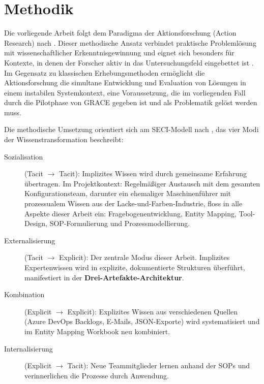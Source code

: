 \section{Methodik}
\label{sec:Methodik}


Die vorliegende Arbeit folgt dem Paradigma der Aktionsforschung (Action Research) nach \cite{lewin:action_research1946}. Dieser methodische Ansatz verbindet praktische Problemlösung mit wissenschaftlicher Erkenntnisgewinnung und eignet sich besonders für Kontexte, in denen der Forscher aktiv in das Untersuchungsfeld eingebettet ist \citep{reason:handbook_action_research2001}. Im Gegensatz zu klassischen Erhebungsmethoden ermöglicht die Aktionsforschung die simultane Entwicklung und Evaluation von Lösungen in einem instabilen Systemkontext, eine Voraussetzung, die im vorliegenden Fall durch die Pilotphase von GRACE gegeben ist und als Problematik gelöst werden muss.

Die methodische Umsetzung orientiert sich am SECI-Modell nach \cite{nonaka:knowledge_creating_company1995}, das vier Modi der Wissenstransformation beschreibt:

\begin{description}
    \item[Sozialisation] (Tacit $\rightarrow$ Tacit): Implizites Wissen wird durch gemeinsame Erfahrung übertragen. Im Projektkontext: Regelmäßiger Austausch mit dem gesamten Konfigurationsteam, darunter ein ehemaliger Maschinenführer mit prozessualem Wissen aus der Lacke-und-Farben-Industrie, floss in alle Aspekte dieser Arbeit ein: Fragebogenentwicklung, Entity Mapping, Tool-Design, SOP-Formulierung und Prozessmodellierung.

    \item[Externalisierung] (Tacit $\rightarrow$ Explicit): Der zentrale Modus dieser Arbeit. Implizites Expertenwissen wird in explizite, dokumentierte Strukturen überführt, manifestiert in der \textbf{Drei-Artefakte-Architektur}.

    \item[Kombination] (Explicit $\rightarrow$ Explicit): Explizites Wissen aus verschiedenen Quellen (Azure DevOps Backlogs, E-Mails, JSON-Exporte) wird systematisiert und im Entity Mapping Workbook neu kombiniert.

    \item[Internalisierung] (Explicit $\rightarrow$ Tacit): Neue Teammitglieder lernen anhand der SOPs und verinnerlichen die Prozesse durch Anwendung.
\end{description}


